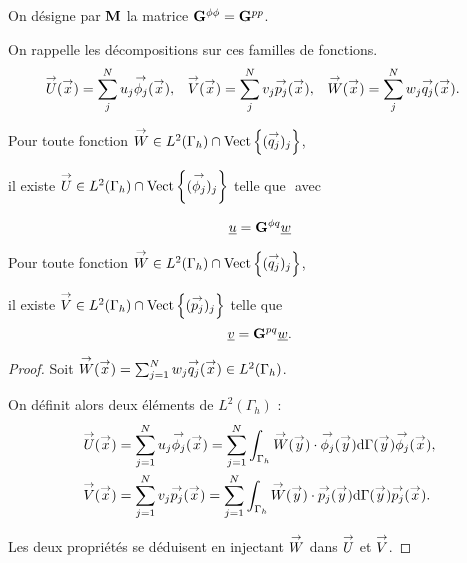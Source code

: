   \begin{defn}
    On désigne par \(\mM\) la matrice \(\mG{\phi}{\phi} = \mG{p}{p}\).
  \end{defn}

  On rappelle les décompositions sur ces familles de fonctions.
  \begin{align*}
    \vect{U}(\vx) &= \sum_j^N  u_j \phij(\vx),
    &
    \vect{V}(\vx) &= \sum_j^N  v_j \pj(\vx),
    &
    \vect{W}(\vx) &= \sum_j^N  w_j \qj(\vx).
  \end{align*}

  \begin{prop}
    Pour toute fonction \(\vect{W} \in L^2(\Gamma_h)\cap\Vect{(\qj)_j}\),

    il existe \(\vect{U} \in L^2(\Gamma_h) \cap \Vect{(\phij)_j} \) telle que \(\) avec

    \begin{equation*}
      \comp{u} = \mG{\phi}{q}\comp{w}
    \end{equation*}
  \end{prop}

  \begin{prop}
    Pour toute fonction \(\vect{W} \in L^2(\Gamma_h)\cap\Vect{(\qj)_j}\),

    il existe \(\vect{V} \in L^2(\Gamma_h) \cap \Vect{(\pj)_j} \) telle que
    \begin{equation*}
      \comp{v} = \mG{p}{q}\comp{w}.
    \end{equation*}
  \end{prop}

  \begin{proof}
    Soit  \(\vect{W}(\vx) = \sum_{j=1}^N w_j \qj(\vx) \in L^2(\Gamma_h)\).

    On définit alors deux éléments de \(L^2(\Gamma_h)\) :
    \begin{align*}
      \vect{U}(\vx) &= \sum_{j=1}^N u_j \phij(\vx) = \sum_{j=1}^N \int_{\Gamma_h}\vect{W}(\vy)\cdot\phij(\vy)\dd{\Gamma}(\vy) \phij(\vx),
      \\
      \vect{V}(\vx) &= \sum_{j=1}^N v_j \pj(\vx) = \sum_{j=1}^N \int_{\Gamma_h}\vect{W}(\vy)\cdot\pj(\vy)\dd{\Gamma}(\vy) \pj(\vx).
    \end{align*}

    Les deux propriétés se déduisent en injectant \(\vect{W}\) dans \(\vect{U}\) et \(\vect{V}\).
  \end{proof}




